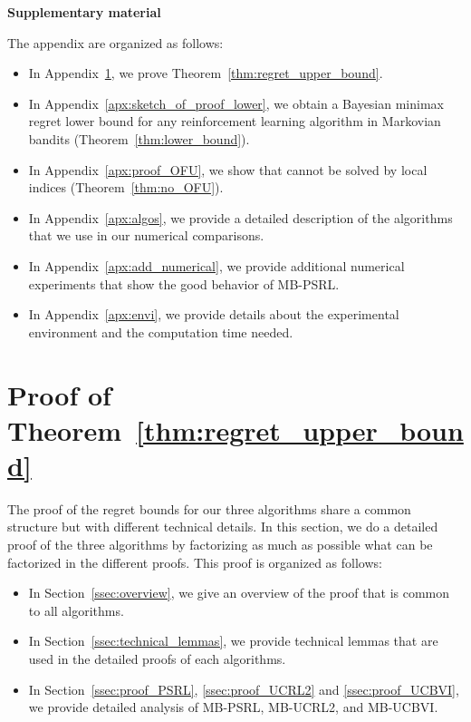 \begin{subappendices}

\begin{center}
    \bfseries \Large Supplementary material
\end{center}

The appendix are organized as follows:
\begin{itemize}
    \item In Appendix~\ref{apx:proof_thm1}, we prove Theorem~\ref{thm:regret_upper_bound}. 
    \item In Appendix~\ref{apx:sketch_of_proof_lower}, we obtain a Bayesian minimax regret lower bound for any reinforcement learning algorithm in Markovian bandits (Theorem~\ref{thm:lower_bound}).
    \item In Appendix~\ref{apx:proof_OFU}, we show that  cannot be solved by local indices (Theorem~\ref{thm:no_OFU}).
    \item In Appendix~\ref{apx:algos}, we provide a detailed description of the algorithms that we use in our numerical comparisons. 
    \item In Appendix~\ref{apx:add_numerical}, we provide additional numerical experiments that show the good behavior of MB-PSRL. 
    \item In Appendix~\ref{apx:envi}, we provide details about the experimental environment and the computation time needed. 
\end{itemize}

\section{Proof of Theorem~\ref{thm:regret_upper_bound}}
\label{apx:proof_thm1}

The proof of the regret bounds for our three algorithms share a common structure but with different technical details.  In this section, we do a detailed proof of the three algorithms by factorizing as much as possible what can be factorized in the different proofs. This proof is organized as follows:
\begin{itemize}
    \item In Section~\ref{ssec:overview}, we give an overview of the proof that is common to all algorithms. 
    \item In Section~\ref{ssec:technical_lemmas}, we provide technical lemmas that are used in the detailed proofs of each algorithms. 
    \item In Section~\ref{ssec:proof_PSRL}, \ref{ssec:proof_UCRL2} and \ref{ssec:proof_UCBVI}, we provide detailed analysis of MB-PSRL, MB-UCRL2, and MB-UCBVI. 
\end{itemize}


\end{subappendices}
